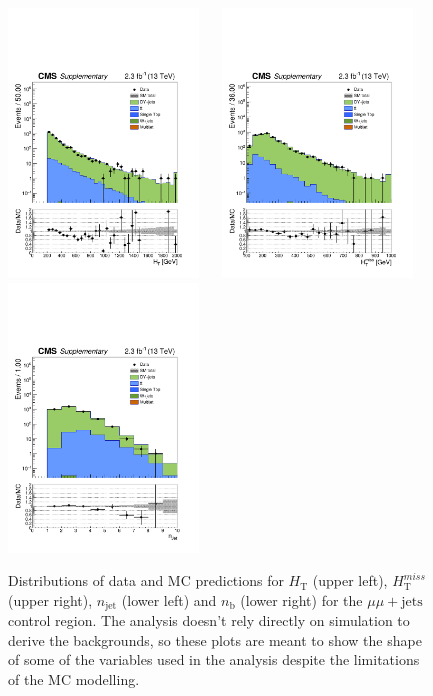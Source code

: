 \clearpage
\begin{figure}[tbhp]
    \caption{ 
    Distributions of data and MC predictions for $H_{\mathrm{T}}$
    (upper left), $H_{\mathrm{T}}^{miss}$ (upper right),
    $n_{\mathrm{jet}}$ (lower left) and $n_{\mathrm{b}}$ (lower right)  
    for the $\mu\mu+\mathrm{jets}$ control region. 
    The analysis doesn't rely directly on simulation to derive the backgrounds, 
    so these plots are meant to show the shape of some of the variables used in the analysis despite the limitations 
    of the MC modelling. 
    \label{fig:data-MC_plots_DoubleMu} }
  \begin{center}
     \includegraphics[width=0.45\textwidth]{DoubleMu_ht40_all_all_aux} ~~
     \includegraphics[width=0.45\textwidth]{DoubleMu_mht40_pt_all_all_aux} \\
     \includegraphics[width=0.45\textwidth]{DoubleMu_nJet40_all_all_aux} ~~

\end{center}
\end{figure}
